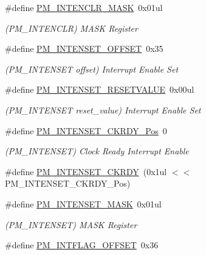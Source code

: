 \begin{DoxyCompactItemize}
\item 
\#define \mbox{\hyperlink{group___s_a_m_d21___p_m_ga69858d0d83319582e961338ebf0e6def}{P\+M\+\_\+\+I\+N\+T\+E\+N\+C\+L\+R\+\_\+\+M\+A\+SK}}~0x01ul
\begin{DoxyCompactList}\small\item\em (P\+M\+\_\+\+I\+N\+T\+E\+N\+C\+LR) M\+A\+SK Register \end{DoxyCompactList}\item 
\#define \mbox{\hyperlink{group___s_a_m_d21___p_m_gacbb9e160784aa556b444d77c22d69b5e}{P\+M\+\_\+\+I\+N\+T\+E\+N\+S\+E\+T\+\_\+\+O\+F\+F\+S\+ET}}~0x35
\begin{DoxyCompactList}\small\item\em (P\+M\+\_\+\+I\+N\+T\+E\+N\+S\+ET offset) Interrupt Enable Set \end{DoxyCompactList}\item 
\#define \mbox{\hyperlink{group___s_a_m_d21___p_m_ga1ff5cf286622565d1fdcfcae1e552bfd}{P\+M\+\_\+\+I\+N\+T\+E\+N\+S\+E\+T\+\_\+\+R\+E\+S\+E\+T\+V\+A\+L\+UE}}~0x00ul
\begin{DoxyCompactList}\small\item\em (P\+M\+\_\+\+I\+N\+T\+E\+N\+S\+ET reset\+\_\+value) Interrupt Enable Set \end{DoxyCompactList}\item 
\#define \mbox{\hyperlink{group___s_a_m_d21___p_m_ga35e8b950869829eb8c88866bb6f5c8ac}{P\+M\+\_\+\+I\+N\+T\+E\+N\+S\+E\+T\+\_\+\+C\+K\+R\+D\+Y\+\_\+\+Pos}}~0
\begin{DoxyCompactList}\small\item\em (P\+M\+\_\+\+I\+N\+T\+E\+N\+S\+ET) Clock Ready Interrupt Enable \end{DoxyCompactList}\item 
\#define \mbox{\hyperlink{group___s_a_m_d21___p_m_ga080bbe9fc280b86fb0b311276d5637e1}{P\+M\+\_\+\+I\+N\+T\+E\+N\+S\+E\+T\+\_\+\+C\+K\+R\+DY}}~(0x1ul $<$$<$ P\+M\+\_\+\+I\+N\+T\+E\+N\+S\+E\+T\+\_\+\+C\+K\+R\+D\+Y\+\_\+\+Pos)
\item 
\#define \mbox{\hyperlink{group___s_a_m_d21___p_m_ga913aa0f4020e344151814557d64767d7}{P\+M\+\_\+\+I\+N\+T\+E\+N\+S\+E\+T\+\_\+\+M\+A\+SK}}~0x01ul
\begin{DoxyCompactList}\small\item\em (P\+M\+\_\+\+I\+N\+T\+E\+N\+S\+ET) M\+A\+SK Register \end{DoxyCompactList}\item 
\#define \mbox{\hyperlink{group___s_a_m_d21___p_m_ga9f885fcf58926ce0a55a0cb84523b6cc}{P\+M\+\_\+\+I\+N\+T\+F\+L\+A\+G\+\_\+\+O\+F\+F\+S\+ET}}~0x36
$$
\end{DoxyCompactItemize}
